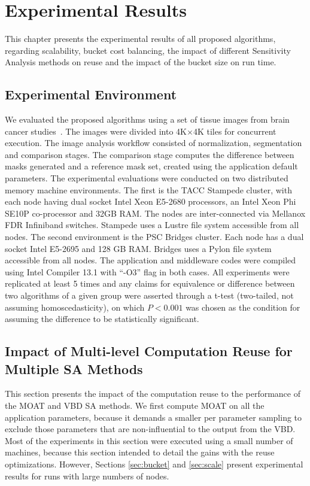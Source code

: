 \section{Experimental Results}

This chapter presents the experimental results of all proposed algorithms, regarding scalability, bucket cost balancing, the impact of different Sensitivity Analysis methods on reuse and the impact of the bucket size on run time.

\subsection{Experimental Environment}

We evaluated the proposed algorithms using a set of tissue images from brain cancer studies~\cite{kong2013machine}. The images were divided into 4K$\times$4K tiles for concurrent execution.  The image analysis workflow consisted of normalization, segmentation and comparison stages. The comparison stage computes the difference between masks generated and a reference mask set, created using the application default parameters. The experimental evaluations were conducted on two distributed memory machine environments. The first is the TACC Stampede cluster, with each node having dual socket Intel Xeon E5-2680 processors, an Intel Xeon Phi SE10P co-processor and 32GB RAM. The nodes are inter-connected via Mellanox FDR Infiniband switches. Stampede uses a Lustre file system accessible from all nodes. The second environment is the PSC Bridges cluster. Each node has a dual socket Intel E5-2695 and 128 GB RAM. Bridges uses a Pylon file system accessible from all nodes. The application and middleware codes were compiled using Intel Compiler 13.1 with ``-O3'' flag in both cases. All experiments were replicated at least 5 times and any claims for equivalence or difference between two algorithms of a given group were asserted through a t-test (two-tailed, not assuming homoscedasticity), on which $P < 0.001$ was chosen as the condition for assuming the difference to be statistically significant.

\subsection{Impact of Multi-level Computation Reuse for Multiple SA Methods} \label{sec:opt-search}

This section presents the impact of the computation reuse to the performance
of the MOAT and VBD SA methods. We first compute MOAT on all the application
parameters, because it demands a smaller per parameter sampling to exclude
those parameters that are non-influential to the output from the VBD. Most of
the experiments in this section were executed using a small number of machines,
because this section intended to detail the gains with the reuse optimizations.
However, Sections \ref{sec:bucket} and \ref{sec:scale} present experimental 
results for runs with large numbers of nodes.


